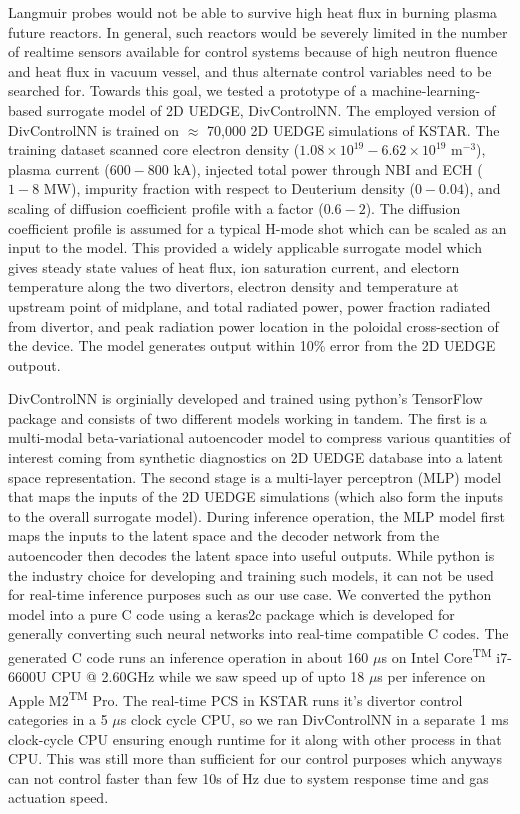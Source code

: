 Langmuir probes would not be able to survive high heat flux in burning plasma future reactors.
In general, such reactors would be severely limited in the number of realtime sensors available for control systems because of high neutron fluence and heat flux in vacuum vessel, and thus alternate control variables need to be searched for.
Towards this goal, we tested a prototype of a machine-learning-based surrogate model of 2D UEDGE, DivControlNN.
The employed version of DivControlNN is trained on $\approx$ 70,000 2D UEDGE simulations of KSTAR.
The training dataset scanned core electron density ($1.08 \times 10^{19} - 6.62 \times 10^{19}$ m$^{-3}$), plasma current ($600-800$ kA), injected total power through NBI and ECH ($1-8$ MW), impurity fraction with respect to Deuterium density ($0-0.04$), and scaling of diffusion coefficient profile with a factor ($0.6 - 2$).
The diffusion coefficient profile is assumed for a typical H-mode shot which can be scaled as an input to the model.
This provided a widely applicable surrogate model which gives steady state values of heat flux, ion saturation current, and electorn temperature along the two divertors, electron density and temperature at upstream point of midplane, and total radiated power, power fraction radiated from divertor, and peak radiation power location in the poloidal cross-section of the device.
The model generates output within 10\% error from the 2D UEDGE outpout.

DivControlNN is orginially developed and trained using python's TensorFlow package and consists of two different models working in tandem.
The first is a multi-modal beta-variational autoencoder\cite{Higgins_2017_ICLR} model to compress various quantities of interest coming from synthetic diagnostics on 2D UEDGE database into a latent space representation.
The second stage is a multi-layer perceptron (MLP) model that maps the inputs of the 2D UEDGE simulations (which also form the inputs to the overall surrogate model).
During inference operation, the MLP model first maps the inputs to the latent space and the decoder network from the autoencoder then decodes the latent space into useful outputs.
While python is the industry choice for developing and training such models, it can not be used for real-time inference purposes such as our use case.
We converted the python model into a pure C code using a keras2c\cite{keras2c} package which is developed for generally converting such neural networks into real-time compatible C codes.
The generated C code runs an inference operation in about 160 $\mu$s on Intel\textsuperscript{\textregistered} Core\textsuperscript{TM} i7-6600U CPU @ 2.60GHz while we saw speed up of upto 18 $\mu$s per inference on Apple\textsuperscript{\textregistered} M2\textsuperscript{TM} Pro.
The real-time PCS in KSTAR runs it's divertor control categories in a 5 $\mu$s clock cycle CPU, so we ran DivControlNN in a separate 1 ms clock-cycle CPU ensuring enough runtime for it along with other process in that CPU.
This was still more than sufficient for our control purposes which anyways can not control faster than few 10s of Hz due to system response time and gas actuation speed.


